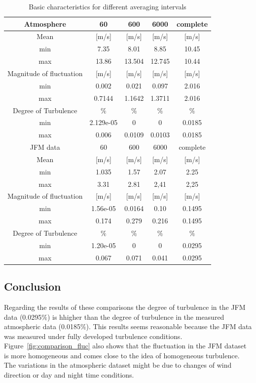 \documentclass[12pt]{article}
\begin{document}
\begin{table}[H]
\begin{center}
\begin{tabular}{c| c c c c}
\hline
Atmosphere &60&600&6000&complete\\
\hline
Mean &[m/s]&[m/s]&[m/s]&[m/s]\\
min&7.35&8.01&8.85&10.45\\
max&13.86&13.504&12.745&10.44\\
\hline
Magnitude of fluctuation &[m/s]&[m/s]&[m/s]&[m/s]\\

min&0.002&0.021&0.097&2.016\\
max&0.7144&1.1642&1.3711&2.016\\
\hline
Degree of Turbulence&$\%$&$\%$&$\%$&$\%$\\
min&2.129e-05&	0&	0&0.0185\\
max&0.006&	0.0109	&0.0103&0.0185\\
\hline
JFM data&60&600&6000&complete\\
\hline
Mean &[m/s]&[m/s]&[m/s]&[m/s]\\
min&1.035&	1.57&	2.07&	2.25\\
max&3.31&	2.81&	2,41&	2,25\\
\hline
Magnitude of fluctuation &[m/s]&[m/s]&[m/s]&[m/s]\\
min&1.56e-05&0.0164&0.10&0.1495\\
max&0.174&0.279&0.216&0.1495\\
\hline
Degree of Turbulence&$\%$&$\%$&$\%$&$\%$\\
min&1.20e-05&	0&	0	&0.0295\\
max&0.067&	0.071&0.041&	0.0295\\
\hline
\end{tabular}
\caption{Basic characteristics for different averaging intervals}
\label{table:basic_char}
\end{center}
\end{table}
\subsection{Conclusion}
Regarding the results of these comparisons the degree of turbulence in the JFM data (0.0295$\%$) is hhigher than the degree of turbulence in the measured atmospheric data (0.0185$\%$). This results seems reasonable because the JFM data was measured under fully developed turbulence conditions. Figure~\ref{fig:comparison_fluc} also shows that the fluctuation in the JFM dataset is more homogeneous and comes close to the idea of homogeneous turbulence. The variations in the atmospheric dataset might be due to changes of wind direction or day and night time conditions.
\end{document}
